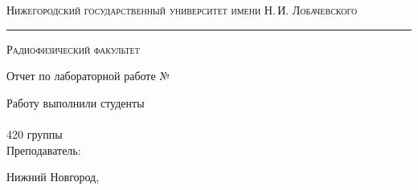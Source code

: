 \begin{titlepage}

\begin{center}

	\textsc{Нижегородский государственный университет имени Н.\,И. Лобачевского}
	\vskip 4pt \hrule \vskip 8pt
	\textsc{Радиофизический факультет}

	\vfill

	{\Large Отчет по лабораторной работе №\labnum \vskip 20pt\bfseries \labname}

\end{center}

\vfill

\begin{flushright}
	{Работу выполнили студенты\\ \authors\\ 420 группы\\ \vskip 14pt Преподаватель:\\ \sciadviser}
\end{flushright}

\vfill

\begin{center}
	Нижний Новгород, \the\year
\end{center}

\end{titlepage}